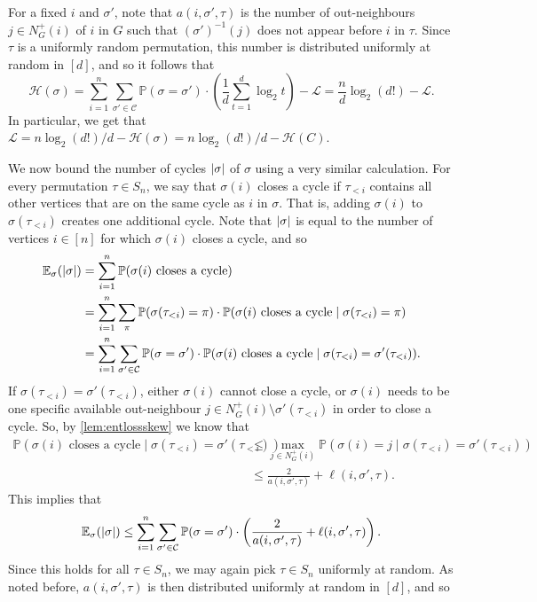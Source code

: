 \documentclass[11pt]{article}
\makeatletter
\theoremstyle{plain}
\theoremstyle{definition}
\renewenvironment{proof}[1][\proofname]
{\par\pushQED{\qed}
	\normalfont\topsep6\p@\@plus6\p@\relax\trivlist
	\item[\hskip\labelsep\bfseries#1\@addpunct{.}]
	\ignorespaces}
{\popQED\endtrivlist\@endpefalse}
\newcommand{\pr}{\mathbb{P}}
\newcommand{\ev}{\mathbb{E}}
\newcommand{\ent}{\mathcal{H}}
\newcommand{\cL}{\mathcal L}
\newcommand{\C}{\mathcal C}
\newcommand{\logt}{\log_2}
\DeclarePairedDelimiter{\abs}{\lvert}{\rvert}
\makeatother
\begin{document}
\begin{proof}
    For a fixed $i$ and $\sigma'$, note that $a(i,\sigma',\tau)$ is the number of out-neighbours $j \in N_G^+(i)$ of $i$ in $G$ such that $(\sigma')^{-1}(j)$ does not appear before $i$ in $\tau$. Since $\tau$ is a uniformly random permutation, this number is distributed uniformly at random in $[d]$, and so it follows that
    \[
        \ent(\sigma) = \sum_{i=1}^n \sum_{\sigma' \in \C} \pr(\sigma = \sigma') \cdot \left(\frac{1}{d} \sum_{t=1}^d \logt t\right) - \cL = \frac{n}{d} \logt(d!) - \cL.
    \]
    In particular, we get that $\cL = n \logt(d!) / d - \ent(\sigma) = n \logt(d!) / d - \ent(C)$.

    We now bound the number of cycles $\abs{\sigma}$ of $\sigma$ using a very similar calculation. For every permutation $\tau \in S_n$, we say that $\sigma(i)$ closes a cycle if $\tau_{<i}$ contains all other vertices that are on the same cycle as $i$ in $\sigma$. That is, adding $\sigma(i)$ to $\sigma(\tau_{<i})$ creates one additional cycle. Note that $\abs{\sigma}$ is equal to the number of vertices $i \in [n]$ for which $\sigma(i)$ closes a cycle, and so
    \begin{align*}
        \ev_\sigma(\abs{\sigma}) & = \sum_{i = 1}^n \pr(\sigma(i) \text{ closes a cycle}) \\
        & = \sum_{i=1}^n \sum_\pi \pr(\sigma(\tau_{<i}) = \pi) \cdot \pr(\sigma(i) \text{ closes a cycle} \mid \sigma(\tau_{<i}) = \pi) \\
        & = \sum_{i=1}^n \sum_{\sigma' \in \C} \pr(\sigma = \sigma') \cdot \pr(\sigma(i) \text{ closes a cycle} \mid \sigma(\tau_{<i}) = \sigma'(\tau_{<i})).
    \end{align*}
    If $\sigma(\tau_{<i}) = \sigma'(\tau_{<i})$, either $\sigma(i)$ cannot close a cycle, or $\sigma(i)$ needs to be one specific available out-neighbour $j \in N_G^+(i) \setminus \sigma'(\tau_{<i})$ in order to close a cycle. So, by \cref{lem:entlossskew} we know that
    \begin{align*}
        \pr(\sigma(i) \text{ closes a cycle} \mid \sigma(\tau_{<i}) = \sigma'(\tau_{<i})) & \le \max_{j \in N_G^+(i)} \pr(\sigma(i) = j \mid \sigma(\tau_{<i}) = \sigma'(\tau_{<i})) \\
        & \le \frac{2}{a(i,\sigma',\tau)} + \ell(i,\sigma',\tau).
    \end{align*}
    This implies that
    \[
        \ev_\sigma(\abs{\sigma}) \le \sum_{i=1}^n \sum_{\sigma' \in \C} \pr(\sigma = \sigma') \cdot \left(\frac{2}{a(i,\sigma',\tau)} + \ell(i,\sigma',\tau)\right).
    \]
    Since this holds for all $\tau \in S_n$, we may again pick $\tau \in S_n$ uniformly at random. As noted before, $a(i,\sigma',\tau)$ is then distributed uniformly at random in $[d]$, and so

\end{proof}
\end{document}
